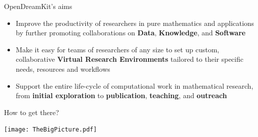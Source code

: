 \documentclass{beamer}
\begin{document}
\begin{frame}{OpenDreamKit's aims}
  \begin{itemize}
  \item Improve the productivity of researchers in pure mathematics and
    applications by further promoting collaborations on \textbf{Data},
    \textbf{Knowledge}, and \textbf{Software}
  \item Make it easy for teams of researchers of any size to set up
    custom, collaborative \textbf{Virtual Research Environments}
    tailored to their specific needs, resources and workflows
  \item Support the entire life-cycle of computational work in
    mathematical research, from \textbf{initial exploration} to
    \textbf{publication}, \textbf{teaching}, and \textbf{outreach}
  \end{itemize}
\end{frame}

\begin{frame}{How to get there?}
  \label{how-to-get-there}
  \begin{bigcenter}
    \texttt{[image: TheBigPicture.pdf]}
  \end{bigcenter}
\end{frame}
\end{document}
